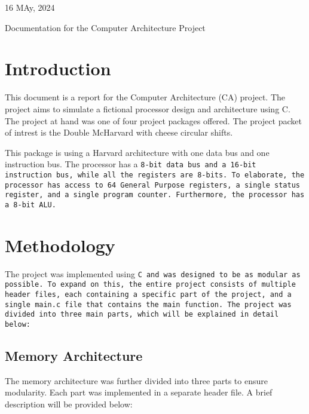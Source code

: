 \documentclass[a4paper,12pt]{article}
\begin{document}
\pagecolor{background}
\color{foreground}

\par{
	\flushleft\large
	16 MAy, 2024
}

\par{\Huge
	\flushleft{}
	Documentation for the Computer Architecture Project
}

\line

\section{Introduction}
	\par{
		This document is a report for the Computer Architecture (CA) project.
		The project aims to simulate a fictional processor design and
		architecture using C. The project at hand was one of four project
		packages offered. The project packet of intrest is the Double McHarvard
		with cheese circular shifts.
	}
	\par{
		This package is using a Harvard architecture with one data bus and one
		instruction bus. The processor has a \tt{8-bit} data bus and a
		\tt{16-bit} instruction bus, while all the registers are \tt{8-bits}.
		To elaborate, the processor has access to \tt{64} General Purpose
		registers, a single status register, and a single program counter.
		Furthermore, the processor has a \tt{8-bit} ALU. 
	}

\section{Methodology}
	\par{
		The project was implemented using \tt{C} and was designed to be as
		modular as possible. To expand on this, the entire project consists of
		multiple header files, each containing a specific part of the project,
		and a single \tt{main.c} file that contains the main function. The
		project was divided into three main parts, which will be explained in
		detail below:

	}
	\subsection{Memory Architecture}
		\par{
			The memory architecture was further divided into three parts to
			ensure modularity. Each part was implemented in a separate header
			file. A brief description will be provided below:
		}
\end{document}
